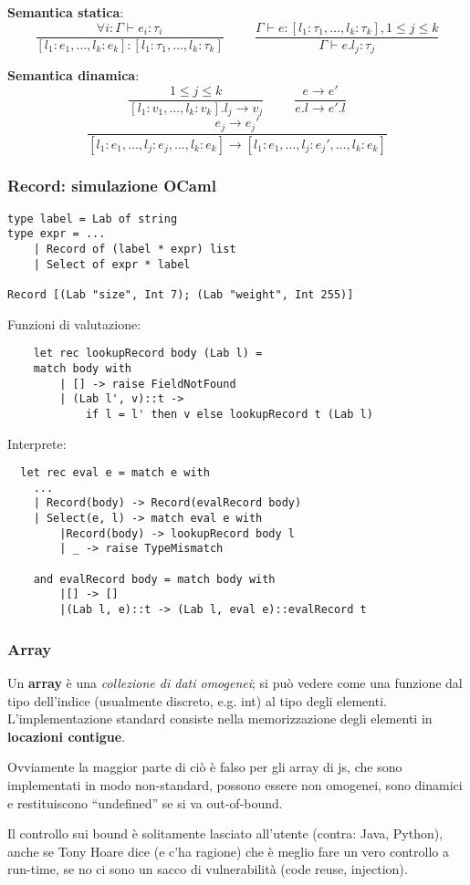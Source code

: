 \documentclass[a4paper,10pt]{article}
\begin{document}
\textbf{Semantica statica}: 
 \[\frac{\forall i : \Gamma \vdash e_i : \tau_i}{[l_1 : e_1,\hdots, l_k:e_k] : [l_1 :\tau_1,\hdots, l_k : \tau_k]}  \hspace{1cm}
 \frac{\Gamma \vdash e : [l_1 :\tau_1,\hdots, l_k : \tau_k], 1 \leq j \leq k}{\Gamma \vdash e.l_j : \tau_j}
 \]

\textbf{Semantica dinamica}: 
  \[\frac{1 \leq j \leq k}{[l_1 : v_1,\hdots, l_k:v_k].l_j \to v_j}  \hspace{1cm}
 \frac{e \to e'}{e.l \to e'.l}
 \]
 \[\frac{e_j \to e_j'}{[l_1:e_1,\hdots,  l_j:e_j, \hdots, l_k:e_k] \to [l_1:e_1,\hdots,  l_j:e_j', \hdots, l_k:e_k]}\]
 
 \subsubsection{Record: simulazione OCaml}
 \begin{lstlisting}
type label = Lab of string
type expr = ...
    | Record of (label * expr) list
    | Select of expr * label
    
Record [(Lab "size", Int 7); (Lab "weight", Int 255)]
 \end{lstlisting}

 Funzioni di valutazione:
 
 \begin{lstlisting}
    let rec lookupRecord body (Lab l) =
    match body with
        | [] -> raise FieldNotFound
        | (Lab l', v)::t ->
            if l = l' then v else lookupRecord t (Lab l)
 \end{lstlisting}

 Interprete:
 \begin{lstlisting}
  let rec eval e = match e with
    ...
    | Record(body) -> Record(evalRecord body)
    | Select(e, l) -> match eval e with
        |Record(body) -> lookupRecord body l
        | _ -> raise TypeMismatch

    and evalRecord body = match body with
        |[] -> []
        |(Lab l, e)::t -> (Lab l, eval e)::evalRecord t
 \end{lstlisting}

 \subsubsection{Array}
Un \textbf{array} è una \emph{collezione di dati omogenei}; si può vedere come una funzione dal tipo dell'indice (usualmente discreto, e.g. int) al tipo degli elementi. L'implementazione standard consiste nella memorizzazione degli elementi in \textbf{locazioni contigue}. \smallskip

Ovviamente la maggior parte di ciò è falso per gli array di js, che sono implementati in modo non-standard, possono essere non omogenei, sono dinamici e restituiscono ``undefined'' se si va out-of-bound.\smallskip

Il controllo sui bound è solitamente lasciato all'utente (contra: Java, Python), anche se Tony Hoare dice (e c'ha ragione) che è meglio fare un vero controllo a run-time, se no ci sono un sacco di vulnerabilità (code reuse, injection).
\end{document}
